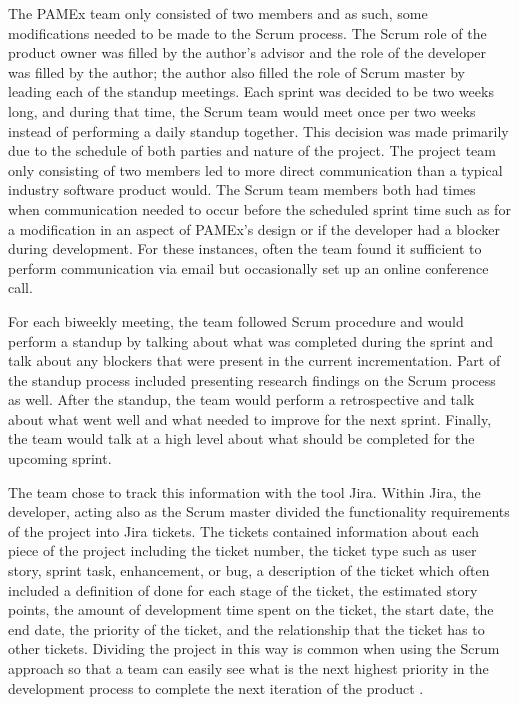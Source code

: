 The PAMEx team only consisted of two members and as such, some modifications needed to be made to the Scrum 
process. The Scrum role of the product owner was filled by the author’s 
advisor and the role of the developer was filled by the author; the 
author also filled the role of Scrum master by leading each of the 
standup meetings. Each sprint was decided to be two weeks long, and 
during that time, the Scrum team would meet once per two 
weeks instead of performing a daily standup together. This decision 
was made primarily due to the schedule of both parties and nature 
of the project. The project team only consisting of two members 
led to more direct communication than a typical industry software 
product would. The Scrum team members both had times when communication 
needed to occur before the scheduled sprint time such as for a 
modification in an aspect of PAMEx’s design or if the developer had a 
blocker during development. For these instances, often the team found it sufficient to perform communication via email but 
occasionally set up an online conference call.  

For each biweekly meeting, the team followed Scrum procedure and would perform a standup by 
talking about what was completed during the sprint \cite{lacey2015} and talk 
about any blockers that were present in the current incrementation. Part of the standup 
process included presenting research findings on the 
Scrum process as well. After the standup, the team would 
perform a retrospective and talk about what went well and what needed 
to improve for the next sprint. Finally, the team would 
talk at a high level about what should be completed for the upcoming 
sprint. 

The team chose to track this information with the tool Jira. Within 
Jira, the developer, acting also as the Scrum master divided the functionality requirements of the project 
into Jira tickets. The tickets contained information about each piece of 
the project including the ticket number, the ticket type such as user 
story, sprint task, enhancement, or bug, a description of the ticket 
which often included a definition of done for each stage of the ticket, 
the estimated story points, the amount of development time spent on the 
ticket, the start date, the end date, the priority of the ticket, and 
the relationship that the ticket has to other tickets. Dividing the project
in this way is common when using the Scrum approach so that a team can
easily see what is the next highest priority in the development process to 
complete the next iteration of the product \cite{lacey2015}.

